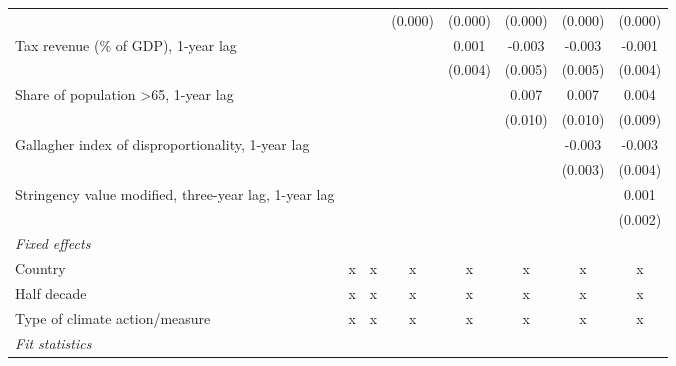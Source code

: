 \begin{table}[htbp]
\begin{tabular}{lccccccc}
                                                                        &                &               & (0.000)      & (0.000)     & (0.000) & (0.000) & (0.000)\\   
      Tax revenue (\% of GDP), 1-year lag                               &                &               &              & 0.001       & -0.003  & -0.003  & -0.001\\   
                                                                        &                &               &              & (0.004)     & (0.005) & (0.005) & (0.004)\\   
      Share of population >65, 1-year lag                               &                &               &              &             & 0.007   & 0.007   & 0.004\\   
                                                                        &                &               &              &             & (0.010) & (0.010) & (0.009)\\   
      Gallagher index of disproportionality, 1-year lag                 &                &               &              &             &         & -0.003  & -0.003\\   
                                                                        &                &               &              &             &         & (0.003) & (0.004)\\   
      Stringency value modified, three-year lag, 1-year lag             &                &               &              &             &         &         & 0.001\\   
                                                                        &                &               &              &             &         &         & (0.002)\\   
      \emph{Fixed effects}\\
      Country                                                           & x              & x             & x            & x           & x       & x       & x\\  
      Half decade                                                       & x              & x             & x            & x           & x       & x       & x\\  
      Type of climate action/measure                                    & x              & x             & x            & x           & x       & x       & x\\  
      \midrule \emph{Fit statistics}\\

\end{tabular}
\end{table}
